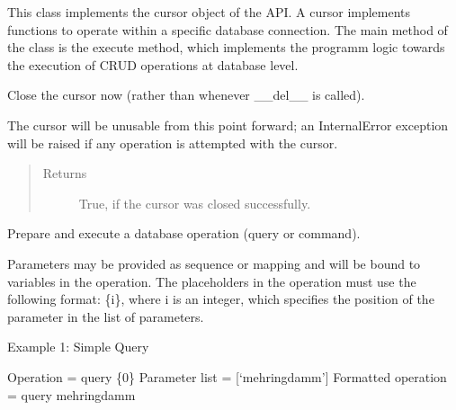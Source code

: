 \documentclass[letterpaper,10pt,english]{sphinxmanual}
\begin{document}
\begin{fulllineitems}
\label{\detokenize{index:secondodb.api.secondoapi.Cursor}}
This class implements the cursor object of the  API. A cursor implements functions to operate within a specific
database connection. The main method of the class is the execute method, which implements the programm logic towards
the execution of CRUD operations at database level.

\begin{fulllineitems}
\label{\detokenize{index:secondodb.api.secondoapi.Cursor.close}}
Close the cursor now (rather than whenever \_\_del\_\_ is called).

The cursor will be unusable from this point forward; an InternalError exception will be raised if any
operation is attempted with the cursor.
\begin{quote}\begin{description}
\item[{Returns}] \leavevmode
True, if the cursor was closed successfully.

\end{description}\end{quote}

\end{fulllineitems}


\begin{fulllineitems}
\label{\detokenize{index:secondodb.api.secondoapi.Cursor.execute}}
Prepare and execute a database operation (query or command).

Parameters may be provided as sequence or mapping and will be bound to variables in the operation. The
placeholders in the operation must use the following format: \{i\}, where i is an integer, which
specifies the position of the parameter in the list of parameters.

Example 1: Simple Query

Operation = query \{0\}
Parameter list = {[}‘mehringdamm’{]}
Formatted operation = query mehringdamm


\end{fulllineitems}
\end{fulllineitems}
\end{document}
